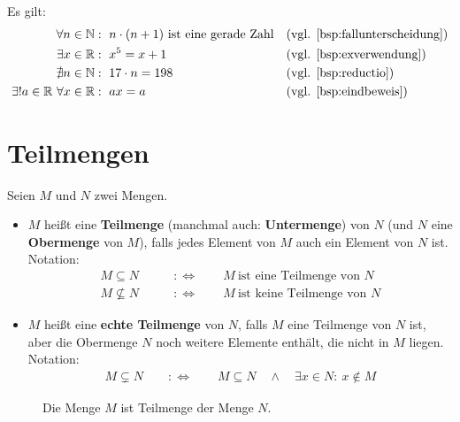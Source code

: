 \begin{bsp}[*]
    Es gilt:
    \begin{align*}
        \forall n\in \N &:\ n\cdot (n+1)\ \text{ist eine gerade Zahl} && (\text{vgl. \cref{bsp:fallunterscheidung}})\\
        \exists x\in \R &:\ x^5 = x+1 && (\text{vgl. \cref{bsp:exverwendung}})\\
        \nexists n\in \N &:\ 17\cdot n = 198 && (\text{vgl. \cref{bsp:reductio}})\\ 
        \exists ! a\in \R \ \forall x\in \R & :\ ax=a &&(\text{vgl. \cref{bsp:eindbeweis}})
    \end{align*}
\end{bsp}





\section{Teilmengen}


\begin{de}[Teilmenge] \label{def:teilmenge} 
    Seien $M$ und $N$ zwei Mengen.
    \begin{itemize}
        \item $M$ heißt eine \textbf{Teilmenge} (manchmal auch: \textbf{Untermenge}) von $N$ (und $N$ eine \textbf{Obermenge} von $M$), falls jedes Element von $M$ auch ein Element von $N$ ist. Notation:
        \begin{align*}
            M \subseteq N \qquad &:\Leftrightarrow\qquad M\ \text{ist eine Teilmenge von $N$} \\
            M \nsubseteq N \qquad &:\Leftrightarrow\qquad M\ \text{ist keine Teilmenge von $N$}
        \end{align*}
        \item $M$ heißt eine \textbf{echte Teilmenge} von $N$, falls $M$ eine Teilmenge von $N$ ist, aber die Obermenge $N$ noch weitere Elemente enthält, die nicht in $M$ liegen. Notation:
        \begin{align*}
            M\subsetneq N \qquad:\Leftrightarrow\qquad M\subseteq N\quad \land\quad \exists x\in N:\ x\notin M
        \end{align*}
    \end{itemize}
\end{de}


\begin{figure}[ht]
    \centering \caption{Die Menge $M$ ist Teilmenge der Menge $N$.}
\end{figure}


